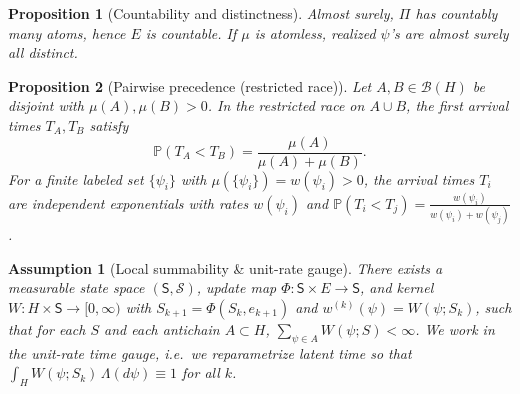 \documentclass[12pt,a4paper]{article}
\newtheorem{proposition}{Proposition}
\newtheorem{remark}{Remark}
\newtheorem{lemma}{Lemma}
\newtheorem{assumption}{Assumption}
\begin{document}
\begin{proposition}[Countability and distinctness]
Almost surely, $\Pi$ has countably many atoms, hence $E$ is countable. If $\mu$ is atomless,
realized $\psi$'s are almost surely all distinct.
\end{proposition}

\begin{proposition}[Pairwise precedence (restricted race)]\label{prop:bt}
Let $A,B\in\mathcal B(H)$ be disjoint with $\mu(A),\mu(B)>0$. In the \emph{restricted race} on $A\cup B$, the first arrival times $T_A,T_B$ satisfy
\[\mathbb P(T_A<T_B)=\frac{\mu(A)}{\mu(A)+\mu(B)}.\]
For a finite labeled set $\{\psi_i\}$ with $\mu(\{\psi_i\})=w(\psi_i)>0$, the arrival times $T_i$ are independent exponentials with rates $w(\psi_i)$ and $\mathbb P(T_i<T_j)=\frac{w(\psi_i)}{w(\psi_i)+w(\psi_j)}$.
\end{proposition}

\begin{assumption}[Local summability \& unit-rate gauge]\label{ax:conservation-state}
There exists a measurable state space $(\mathsf S,\mathcal S)$, update map $\Phi:\mathsf S\times E\to\mathsf S$, and kernel $W:H\times\mathsf S\to[0,\infty)$ with $S_{k+1}=\Phi(S_k,e_{k+1})$ and $w^{(k)}(\psi)=W(\psi;S_k)$, such that for each $S$ and each antichain $A\subset H$, $\sum_{\psi\in A}W(\psi;S)<\infty$. We work in the \emph{unit-rate} time gauge, i.e.\ we reparametrize latent time so that $\int_H W(\psi;S_k)\,\Lambda(d\psi)\equiv 1$ for all $k$.
\end{assumption}

\end{document}
